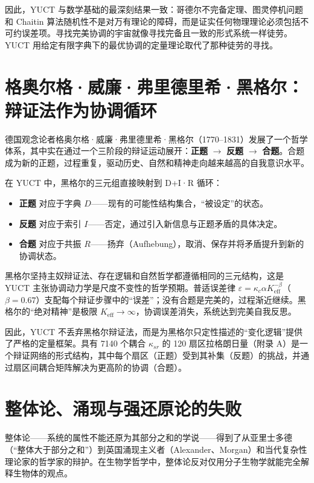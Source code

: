 \documentclass[12pt,a4paper]{article}
\begin{document}
	因此，YUCT 与数学基础的最深刻结果一致：哥德尔不完备定理、图灵停机问题和 Chaitin 算法随机性不是对万有理论的障碍，而是证实任何物理理论必须包括不可约误差项。寻找完美协调的宇宙就像寻找完备且一致的形式系统一样徒劳。YUCT 用给定有限字典下的最优协调的定量理论取代了那种徒劳的寻找。
	
	\section{格奥尔格·威廉·弗里德里希·黑格尔：辩证法作为协调循环}
	
	德国观念论者格奥尔格·威廉·弗里德里希·黑格尔（1770–1831）发展了一个哲学体系，其中实在通过一个三阶段的辩证运动展开：\textbf{正题} \(\to\) \textbf{反题} \(\to\) \textbf{合题}。合题成为新的正题，过程重复，驱动历史、自然和精神走向越来越高的自我意识水平。
	
	在 YUCT 中，黑格尔的三元组直接映射到 D+I·R 循环：
	\begin{itemize}
		\item \textbf{正题} 对应于字典 \(D\)——现有的可能性结构集合，“被设定”的状态。
		\item \textbf{反题} 对应于索引 \(I\)——否定，通过引入新信息与正题矛盾的具体决定。
		\item \textbf{合题} 对应于共振 \(R\)——扬弃（Aufhebung），取消、保存并将矛盾提升到新的协调状态。
	\end{itemize}
	
	黑格尔坚持主奴辩证法、存在逻辑和自然哲学都遵循相同的三元结构，这是 YUCT 主张协调动力学是尺度不变性的哲学预期。普适误差律 \(\varepsilon = \kappa_c \alpha K_{\mathrm{eff}}^{-\beta}\)（\(\beta=0.67\)）支配每个辩证步骤中的“误差”；没有合题是完美的，过程渐近继续。黑格尔的“绝对精神”是极限 \(K_{\mathrm{eff}} \to \infty\)，协调误差消失，系统达到完美自我反思。
	
	因此，YUCT 不丢弃黑格尔辩证法，而是为黑格尔只定性描述的“变化逻辑”提供了严格的定量框架。具有 7140 个耦合 \(\kappa_{sr}\) 的 120 扇区拉格朗日量（附录 A）是一个辩证网络的形式结构，其中每个扇区（正题）受到其补集（反题）的挑战，并通过扇区间耦合矩阵解决为更高阶的协调（合题）。
	
	\section{整体论、涌现与强还原论的失败}
	
	整体论——系统的属性不能还原为其部分之和的学说——得到了从亚里士多德（“整体大于部分之和”）到英国涌现主义者（Alexander、Morgan）和当代复杂性理论家的哲学家的辩护。在生物学哲学中，整体论反对仅用分子生物学就能完全解释生物体的观点。
	
\end{document}
